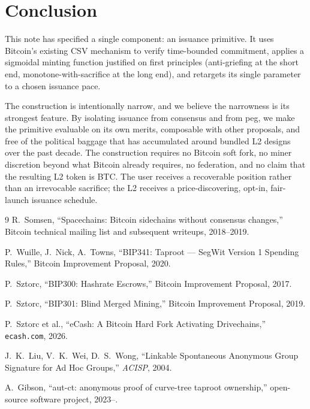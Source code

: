 \documentclass[11pt,a4paper]{article}
\begin{document}
\section{Conclusion}

This note has specified a single component: an issuance primitive. It uses Bitcoin's existing CSV mechanism to verify time-bounded commitment, applies a sigmoidal minting function justified on first principles (anti-griefing at the short end, monotone-with-sacrifice at the long end), and retargets its single parameter to a chosen issuance pace.

The construction is intentionally narrow, and we believe the narrowness is its strongest feature. By isolating issuance from consensus and from peg, we make the primitive evaluable on its own merits, composable with other proposals, and free of the political baggage that has accumulated around bundled L2 designs over the past decade. The construction requires no Bitcoin soft fork, no miner discretion beyond what Bitcoin already requires, no federation, and no claim that the resulting L2 token is BTC. The user receives a recoverable position rather than an irrevocable sacrifice; the L2 receives a price-discovering, opt-in, fair-launch issuance schedule.

\begin{thebibliography}{9}
R.~Somsen, ``Spacechains: Bitcoin sidechains without consensus changes,'' Bitcoin technical mailing list and subsequent writeups, 2018--2019.

P.~Wuille, J.~Nick, A.~Towns, ``BIP341: Taproot --- SegWit Version 1 Spending Rules,'' Bitcoin Improvement Proposal, 2020.

P.~Sztorc, ``BIP300: Hashrate Escrows,'' Bitcoin Improvement Proposal, 2017.

P.~Sztorc, ``BIP301: Blind Merged Mining,'' Bitcoin Improvement Proposal, 2019.

P.~Sztorc et al., ``eCash: A Bitcoin Hard Fork Activating Drivechains,'' \texttt{ecash.com}, 2026.

J.~K.~Liu, V.~K.~Wei, D.~S.~Wong, ``Linkable Spontaneous Anonymous Group Signature for Ad Hoc Groups,'' \emph{ACISP}, 2004.

A.~Gibson, ``aut-ct: anonymous proof of curve-tree taproot ownership,'' open-source software project, 2023--.
\end{thebibliography}
\end{document}
